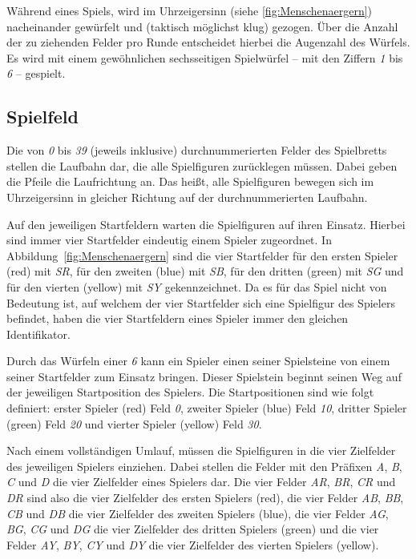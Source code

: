 Während eines Spiels, wird im Uhrzeigersinn (siehe \ref{fig:Menschenaergern}) nacheinander gewürfelt und (taktisch möglichst klug) gezogen. Über die Anzahl der zu ziehenden Felder pro Runde entscheidet hierbei die Augenzahl des Würfels. Es wird mit einem gewöhnlichen sechsseitigen Spielwürfel -- mit den Ziffern \emph{1} bis \emph{6} -- gespielt.

\subsection*{Spielfeld}
Die von \emph{0} bis \emph{39} (jeweils inklusive) durchnummerierten Felder des Spielbretts stellen die Laufbahn dar, die alle Spielfiguren zurücklegen müssen. Dabei geben die Pfeile die Laufrichtung an. Das heißt, alle Spielfiguren bewegen sich im Uhrzeigersinn in gleicher Richtung auf der durchnummerierten Laufbahn.

Auf den jeweiligen Startfeldern warten die Spielfiguren auf ihren Einsatz. Hierbei sind immer vier Startfelder eindeutig einem Spieler zugeordnet. In Abbildung~\ref{fig:Menschenaergern} sind die vier Startfelder für den ersten Spieler (red) mit \emph{SR}, für den zweiten (blue) mit \emph{SB}, für den dritten (green) mit \emph{SG} und für den vierten (yellow) mit \emph{SY} gekennzeichnet. Da es für das Spiel nicht von Bedeutung ist, auf welchem der vier Startfelder sich eine Spielfigur des Spielers befindet, haben die vier Startfeldern eines Spieler immer den gleichen Identifikator.

Durch das Würfeln einer \emph{6} kann ein Spieler einen seiner Spielsteine von einem seiner Startfelder zum Einsatz bringen. Dieser Spielstein beginnt seinen Weg auf der jeweiligen Startposition des Spielers. Die Startpositionen sind wie folgt definiert: erster Spieler (red) Feld \emph{0}, zweiter Spieler (blue) Feld \emph{10}, dritter Spieler (green) Feld \emph{20} und vierter Spieler (yellow) Feld \emph{30}. 

Nach einem vollständigen Umlauf, müssen die Spielfiguren in die vier Zielfelder des jeweiligen Spielers einziehen. Dabei stellen die Felder mit den Präfixen \emph{A}, \emph{B}, \emph{C} und \emph{D} die vier Zielfelder eines Spielers dar. Die vier Felder \emph{AR}, \emph{BR}, \emph{CR} und \emph{DR} sind also die vier Zielfelder des ersten Spielers (red), die vier Felder \emph{AB}, \emph{BB}, \emph{CB} und \emph{DB} die vier Zielfelder des zweiten Spielers (blue), die vier Felder \emph{AG}, \emph{BG}, \emph{CG} und \emph{DG} die vier Zielfelder des dritten Spielers (green) und die vier Felder \emph{AY}, \emph{BY}, \emph{CY} und \emph{DY} die vier Zielfelder des vierten Spielers (yellow).

